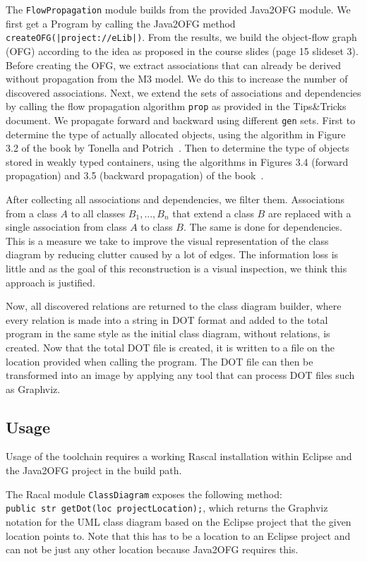 \indent The \texttt{FlowPropagation} module builds from the provided Java2OFG module. 
We first get a Program by calling the Java2OFG method \texttt{createOFG(|project://eLib|)}. 
From the results, we build the object-flow graph (OFG) according to the idea as proposed in the course slides (page 15 slideset 3). 
Before creating the OFG, we extract associations that can already be derived without propagation from the M3 model. 
We do this to increase the number of discovered associations.  
Next, we extend the sets of associations and dependencies by calling the flow propagation algorithm \texttt{prop} 
as provided in the Tips\&Tricks document. 
We propagate forward and backward using different \texttt{gen} sets. 
First to determine the type of actually allocated objects, using the algorithm in Figure 3.2 of the book by Tonella and Potrich~\cite{rev-eng}.
Then to determine the type of objects stored in weakly typed containers, 
using the algorithms in Figures 3.4 (forward propagation) and 3.5 (backward propagation) of the book~\cite{rev-eng}.

After collecting all associations and dependencies, we filter them. 
Associations from a class $A$ to all classes $B_1, ... , B_n$ that extend a class $B$ 
are replaced with a single association from class $A$ to class $B$. The same is done for dependencies. 
This is a measure we take to improve the visual representation of the class diagram by reducing clutter caused by a lot of edges. 
The information loss is little and as the goal of this reconstruction is a visual inspection, we think this approach is justified.

Now, all discovered relations are returned to the class diagram builder, where every relation is made into a string in DOT format and added to the total program in the same style as the initial class diagram, without relations, is created. Now that the total DOT file is created, it is written to a file on the location provided when calling the program. The DOT file can then be transformed into an image by applying any tool that can process DOT files such as Graphviz.

\subsection{Usage}\label{usage}
	Usage of the toolchain requires a working Rascal installation within Eclipse and the Java2OFG project in the build path.

	The Racal module \texttt{ClassDiagram} exposes the following method:\\ \texttt{public str getDot(loc projectLocation);}, which returns the Graphviz notation for the UML class diagram based on the Eclipse project that the given location points to.
	Note that this has to be a location to an Eclipse project and can not be just any other location because Java2OFG requires this.

